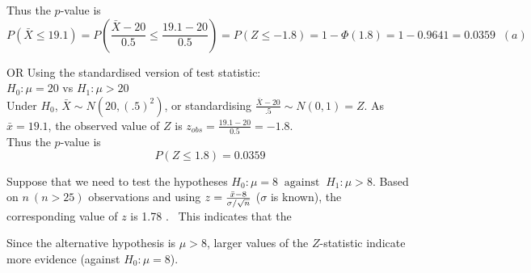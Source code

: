 \documentclass[bigtut]{tutorial}
\begin{document}
\begin{tutorial}
\begin{questions}
\begin{solution}
 Thus the $p$-value is 
\[  P(\bar{X} \leq 19.1)  = P( \frac{\bar{X}  - 20}{0.5} \leq \frac{19.1-20}{0.5} )= P(Z \leq -1.8 ) = 1-\Phi(1.8)  = 1-0.9641 = 0.0359\;\;  (a) \]

\vspace{1cm}
OR Using the standardised version of test statistic: \\


  $H_0: \mu=20$  vs $H_1: \mu > 20$ \\

  Under $H_0$, $\bar{X}  \sim N(20, (.5)^2)$, or standardising 
$\frac{ \bar{X} - 20}{.5} \sim N(0,1) = Z$. 
As $\bar{x}=19.1$, the observed value of  $Z$ is $z_{obs} = \frac{ 19.1 - 20}{0.5} = -1.8$.  \\

 Thus the $p$-value is 
\[ P(Z \leq 1.8) = 0.0359 \]
\end{solution}


\question  
Suppose that we need to test the hypotheses $H_0 : \mu = 8
\;\; \mbox{against} \;\; H_1 : \mu > 8$. Based on $n \ (n>25)$ observations and using  $z ={{\bar x - 8} \over {\sigma/\sqrt{n}}}$
($\sigma$ is known), the corresponding value of $z$ is 1.78 . \  This
indicates that the 

\begin{solution}
Since the alternative hypothesis is $\mu>8$, larger values of the $Z$-statistic indicate more evidence (against $H_0\colon \mu=8$).  \\


\end{solution}
\end{questions}
\end{tutorial}
\end{document}
